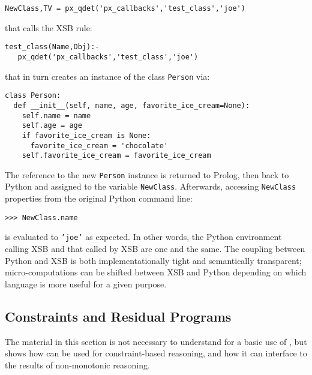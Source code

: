 \begin{verbatim}
NewClass,TV = px_qdet('px_callbacks','test_class','joe')
\end{verbatim}
\noindent
that calls the XSB rule:
\begin{verbatim}
test_class(Name,Obj):-
   px_qdet('px_callbacks','test_class','joe')
\end{verbatim}
that in turn creates an instance of the class {\tt Person} via:
\begin{verbatim}
class Person:
  def __init__(self, name, age, favorite_ice_cream=None):
    self.name = name
    self.age = age
    if favorite_ice_cream is None:
      favorite_ice_cream = 'chocolate'
    self.favorite_ice_cream = favorite_ice_cream
\end{verbatim}
The reference to the new {\tt Person} instance is returned to Prolog,
then back to Python and assigned to the variable {\tt NewClass}.
Afterwards, accessing {\tt NewClass} properties from the original
Python command line:
\begin{verbatim}
>>> NewClass.name
\end{verbatim}
is evaluated to {\tt 'joe'} as expected.  In other words, the Python
environment calling XSB and that called by XSB are one and the same.
The coupling between Python and XSB is both implementationally tight
and semantically transparent; micro-computations can be shifted between
XSB and Python depending on which language is more useful for a given
purpose.

\subsection{Constraints and Residual Programs} 

The material in this section is not necessary to understand for a
basic use of \px{}, but shows how \px{} can be used for
constraint-based reasoning, and how it can interface to the results of
non-monotonic reasoning.

